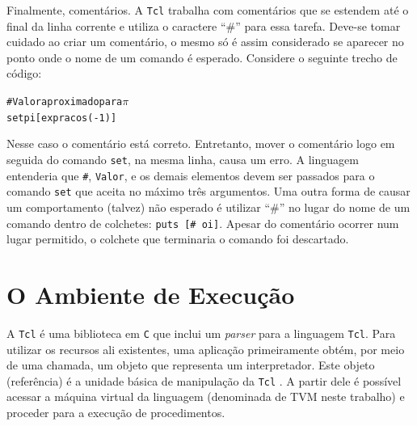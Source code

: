 
Finalmente, comentários. A \texttt{Tcl} trabalha com comentários que
se estendem até o final da linha corrente e utiliza o caractere ``\#''
para essa tarefa. Deve-se tomar cuidado ao criar um comentário, o
mesmo só é assim considerado se aparecer no ponto onde o nome de um
comando é esperado. Considere o seguinte trecho de código:
\begin{alltt}
\# Valor aproximado para \(\pi\)
set pi [expr {acos(-1)}]
\end{alltt}
Nesse caso o comentário está correto. Entretanto, mover
o comentário logo em seguida do comando \verb!set!, na mesma linha,
causa um erro. A linguagem entenderia que \verb!#!, \verb!Valor!, e os
demais elementos devem ser passados para o comando \verb!set! que
aceita no máximo três argumentos. Uma outra forma de
causar um comportamento (talvez) não esperado é utilizar ``\#'' no
lugar do nome de um comando dentro de colchetes:
 \verb!puts [# oi]!.
 Apesar do comentário ocorrer num lugar permitido, o colchete que
terminaria o comando foi descartado.





\section{O Ambiente de Execução}
\label{ambientexec1}


A \texttt{Tcl} é uma biblioteca em \texttt{C} que inclui um
\textit{parser} para a linguagem \texttt{Tcl}. Para utilizar os
recursos ali existentes, uma aplicação primeiramente obtém, por meio
de uma chamada, um objeto que representa um interpretador. Este objeto
(referência) é a unidade básica de manipulação
da \texttt{Tcl} \cite{ousterhout_89}. A partir dele é possível
acessar a máquina virtual da linguagem (denominada de TVM neste trabalho) e
proceder para a execução de procedimentos.

